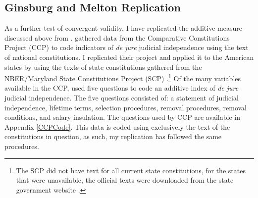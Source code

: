 \documentclass[Johnson MA Draft2.tex]{subfiles}
\begin{document}
\subsection*{Ginsburg and Melton Replication}
As a further test of convergent validity, I have replicated the additive measure discussed above from \citet{Melton2014}.  \citet{Melton2014} gathered data from the Comparative Constitutions Project (CCP) to code indicators of \textit{de jure} judicial independence using the text of national constitutions.  I replicated their project and applied it to the American states by using the texts of state constitutions gathered from the NBER/Maryland State Constitutions Project (SCP) \citep{Wallisnber}.\footnote{The SCP did not have text for all current state constitutions, for the states that were unavailable, the official texts were downloaded from the state government website \citep{Wallisnber}.}  Of the many variables available in the CCP, \citet{Melton2014} used five questions to code an additive index of \textit{de jure} judicial independence.  The five questions consisted of: a statement of judicial independence, lifetime terms, selection procedures, removal procedures, removal conditions, and salary insulation.  The questions used by CCP are available in Appendix \ref{CCPCode}.  This data is coded using exclusively the text of the constitutions in question, as such, my replication has followed the same procedures.
\end{document}
